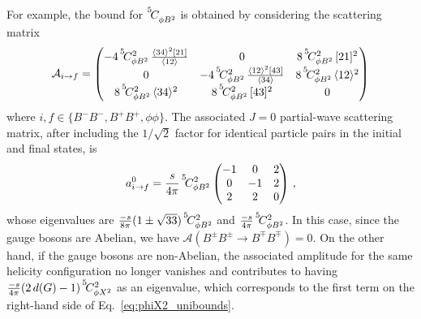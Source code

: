 For example, the bound for $\coef{5}{\phi B^2}{}$ is obtained by considering the scattering matrix
\begin{equation}
    \mathcal A_{i \to f} = 
    \begin{pmatrix}
        -4\,\coef{5}{\phi B^2}{2}\,\frac{\agl{3}{4}^2\sqr{2}{1}}{\agl{1}{2}} & 0 & 8\,\coef{5}{\phi B^2}{2}\,\sqr{2}{1}^2
        \\
        0 & -4\,\coef{5}{\phi B^2}{2}\,\frac{\agl{1}{2}^2\sqr{4}{3}}{\agl{3}{4}} & 8\,\coef{5}{\phi B^2}{2}\,\agl{1}{2}^2
        \\
        8\,\coef{5}{\phi B^2}{2}\,\agl{3}{4}^2 & 8\,\coef{5}{\phi B^2}{2}\,\sqr{4}{3}^2 & 0
    \end{pmatrix}
\end{equation}
where $i,f\in\{B^-B^-,B^+B^+,\phi \phi\}$.
The associated $J=0$ partial-wave scattering matrix, after including the $1/\sqrt{2}$ factor for identical particle pairs in the initial and final states, is
\begin{equation}
    a^0_{i \to f} = \frac{s}{4\pi}\,\coef{5}{\phi B^2}{2}
    \begin{pmatrix}
        -1 & 0 & 2 \\
        0 & -1 & 2 \\
        2 & 2 & 0
    \end{pmatrix}\,,
\end{equation}
whose eigenvalues are $\frac{-s}{8\pi}(1\pm \sqrt{33})\,\coef{5}{\phi B^2}{2}$ and $\frac{-s}{4\pi}\,\coef{5}{\phi B^2}{2}$.
In this case, since the gauge bosons are Abelian, we have $\mathcal A (B^{\pm}B^{\pm} \to B^{\mp}B^{\mp}) = 0$.
On the other hand, if the gauge bosons are non-Abelian, the associated amplitude for the same helicity configuration no longer vanishes and contributes to having $\frac{-s}{4\pi}(2\,d(G)-1)\,\coef{5}{\phi X^2}{2}$ as an eigenvalue, which corresponds to the first term on the right-hand side of Eq.~\eqref{eq:phiX2_unibounds}.

